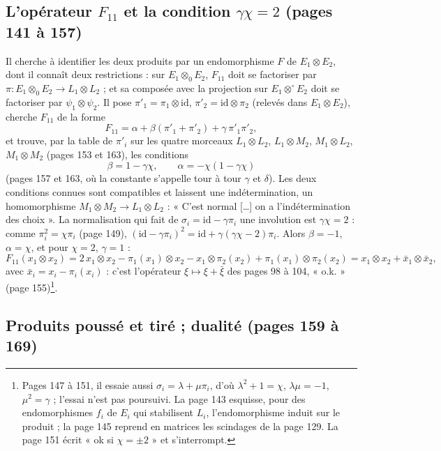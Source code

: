 \documentclass[11pt,a4paper]{article}
\begin{document}
\subsection*{L'opérateur $F_{11}$ et la condition $\gamma\chi = 2$ (pages 141 à 157)}

Il cherche à identifier les deux produits par un endomorphisme $F$ de
$E_1 \otimes E_2$, dont il connaît deux restrictions : sur $E_1 \otimes_0 E_2$, $F_{11}$ doit
se factoriser par $\pi : E_1 \otimes_0 E_2 \to L_1 \otimes L_2$ ; et sa composée avec la
projection sur $E_1 \otimes^{\circ} E_2$ doit se factoriser par $\psi_1 \otimes \psi_2$. Il
pose $\pi'_1 = \pi_1 \otimes \mathrm{id}$, $\pi'_2 = \mathrm{id} \otimes \pi_2$ (relevés dans
$E_1 \otimes E_2$), cherche $F_{11}$ de la forme
\[
  F_{11} = \alpha + \beta(\pi'_1 + \pi'_2) + \gamma\,\pi'_1 \pi'_2,
\]
et trouve, par la table de $\pi'_i$ sur les quatre morceaux $L_1 \otimes L_2$,
$L_1 \otimes M_2$, $M_1 \otimes L_2$, $M_1 \otimes M_2$ (pages 153 et 163), les conditions
\[
  \beta = 1 - \gamma\chi, \qquad \alpha = -\chi(1 - \gamma\chi)
\]
(pages 157 et 163, où la constante s'appelle tour à tour $\gamma$ et $\delta$). Les deux
conditions connues sont compatibles et laissent une indétermination, un
homomorphisme $M_1 \otimes M_2 \to L_1 \otimes L_2$ : « C'est normal […] on a
l'indétermination des choix ». La normalisation qui fait de
$\sigma_i = \mathrm{id} - \gamma\pi_i$ une involution est $\gamma\chi = 2$ : comme
$\pi_i^{2} = \chi\pi_i$ (page 149), $(\mathrm{id} - \gamma\pi_i)^{2} = \mathrm{id} + \gamma(\gamma\chi -
2)\pi_i$. Alors $\beta = -1$, $\alpha = \chi$, et pour $\chi = 2$, $\gamma = 1$ :
\[
  F_{11}(x_1 \otimes x_2) = 2\,x_1 \otimes x_2 - \pi_1(x_1) \otimes x_2 - x_1 \otimes \pi_2(x_2) + \pi_1(x_1) \otimes \pi_2(x_2)
  = x_1 \otimes x_2 + \bar{x}_1 \otimes \bar{x}_2 ,
\]
avec $\bar{x}_i = x_i - \pi_i(x_i)$ : c'est l'opérateur $\xi \mapsto \xi + \bar{\xi}$ des pages
98 à 104, « o.k. » (page 155)\footnote{Pages 147 à 151, il essaie aussi
$\sigma_i = \lambda + \mu\pi_i$, d'où $\lambda^{2} + 1 = \chi$, $\lambda\mu = -1$, $\mu^{2} =
\gamma$ ; l'essai n'est pas poursuivi. La page 143 esquisse, pour des
endomorphismes $f_i$ de $E_i$ qui stabilisent $L_i$, l'endomorphisme induit sur le
produit ; la page 145 reprend en matrices les scindages de la page 129. La page 151
écrit « ok si $\chi = \pm 2$ » et s'interrompt.}.

\subsection*{Produits poussé et tiré ; dualité (pages 159 à 169)}
\end{document}
